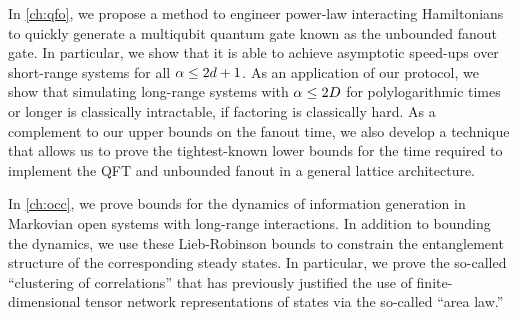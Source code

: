 In \cref{ch:qfo}, we propose a method to engineer power-law interacting Hamiltonians to quickly generate a multiqubit quantum gate known as the unbounded fanout gate. In particular, we show that it is able to achieve asymptotic speed-ups over short-range systems for all $\alpha \le 2d+1$. As an application of our protocol, we show that simulating long-range systems with $\alpha \le 2D$ for polylogarithmic times or longer is classically intractable, if factoring is classically hard. As a complement to our upper bounds on the fanout time, we also develop a technique that allows us to prove the tightest-known lower bounds for the time required to implement the QFT and unbounded fanout in a general lattice architecture.

In \cref{ch:occ}, we prove bounds for the dynamics of information generation in Markovian open systems with long-range interactions. In addition to bounding the dynamics, we use these Lieb-Robinson bounds to constrain the entanglement structure of the corresponding steady states. In particular, we prove the so-called ``clustering of correlations'' that has previously justified the use of finite-dimensional tensor network representations of states via the so-called ``area law.''

